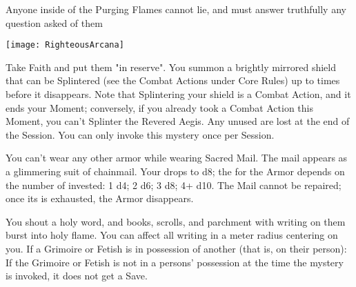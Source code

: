 Anyone inside of the Purging Flames cannot lie, and must answer truthfully any question asked of them


  \begin{center}
  \texttt{[image: RighteousArcana]}
  \end{center}



\MYSTERY [
  Name = Revered Aegis,
  Link = arcana-mystery-revered-aegis,
  Paradigm = Force,
  Save = n/a,
  Duration = Session,
  Target = Self
]

Take \DICE Faith and put them "in reserve".  You summon a brightly mirrored shield that can be Splintered (see the Combat Actions under Core Rules) up to \DICE times before it disappears.  Note that Splintering your shield is a Combat Action, and it ends your Moment; conversely, if you already took a Combat Action this Moment, you can’t Splinter the Revered Aegis.  Any unused \DICE are lost at the end of the Session.  You can only invoke this mystery once per Session.

\MYSTERY [
  Name = Sacred Mail,
  Link = arcana-mystery-sacred-mail,
  Paradigm = Force,
  Save = n/a,
  Duration = Session,
  Target = Self
]

You can't wear any other armor while wearing Sacred Mail.  The mail appears as a glimmering suit of chainmail.  Your \MD drops to d8; the \UD for the Armor depends on the number of \DICE invested:  1 d4; 2 d6; 3 d8; 4+ d10. The Mail cannot be repaired; once its \UD is exhausted, the Armor disappears.

\MYSTERY [
  Name = Satanic Verses,
  Link = arcana-mystery-satanic-verses,
  Paradigm = Entropy,
  Save = See Below,
  Duration = Instant,
  Target = Close
]

You shout a holy word, and books, scrolls, and parchment with writing on them burst into holy flame.  You can affect all writing in a \DICE meter radius centering on you.  If a Grimoire or Fetish is in possession of another (that is, on their person):
If the Grimoire or Fetish is not in a persons' possession at the time the mystery is invoked, it does not get a Save.

